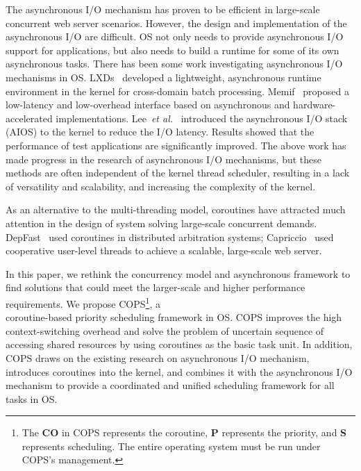 \documentclass[sigconf,review,anonymous]{acmart}
\begin{document}
The asynchronous I/O mechanism has proven to be efficient in large-scale concurrent web server scenarios. However, the design and implementation of the asynchronous I/O are difficult. OS not only needs to provide asynchronous I/O support for applications, but also needs to build a runtime for some of its own asynchronous tasks. There has been some work investigating asynchronous I/O mechanisms in OS. LXDs~\cite{narayanan2019lxds} developed a lightweight, asynchronous runtime environment in the kernel for cross-domain batch processing. Memif~\cite{lin2016memif} proposed a low-latency and low-overhead interface based on asynchronous and hardware-accelerated implementations. Lee~\textit{et al.}~\cite{lee2019asynchronous} introduced the asynchronous I/O stack (AIOS) to the kernel to reduce the I/O latency. Results showed that the performance of test applications are significantly improved. The above work has made progress in the research of asynchronous I/O mechanisms, but these methods are often independent of the kernel thread scheduler, resulting in a lack of versatility and scalability, and increasing the complexity of the kernel.

As an alternative to the multi-threading model, coroutines have attracted much attention in the design of system solving large-scale concurrent demands. DepFast~\cite{luo_depfast_nodate} used coroutines in distributed arbitration systems; Capriccio~\cite{von_behren_capriccio_2003} used cooperative user-level threads to achieve a scalable, large-scale web server. 



In this paper, we rethink the concurrency model and asynchronous framework to find solutions that could meet the larger-scale and higher performance requirements. We propose COPS\footnote{The \textbf{CO} in COPS represents the coroutine, \textbf{P} represents the priority, and \textbf{S} represents scheduling. The entire operating system must be run under COPS's management.}, a \\coroutine-based priority scheduling framework in OS. COPS improves the high context-switching overhead and solve the problem of uncertain sequence of accessing shared resources by using coroutines as the basic task unit. In addition, COPS draws on the existing research on asynchronous I/O mechanism, introduces coroutines into the kernel, and combines it with the asynchronous I/O mechanism to provide a coordinated and unified scheduling framework for all tasks in OS. 
\end{document}
